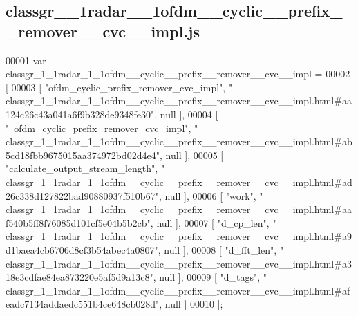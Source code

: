 \subsection{classgr\+\_\+\_\+1radar\+\_\+\_\+1ofdm\+\_\+\+\_\+cyclic\+\_\+\+\_\+prefix\+\_\+\+\_\+remover\+\_\+\+\_\+cvc\+\_\+\+\_\+impl.\+js}
\label{classgr__1__1radar__1__1ofdm____cyclic____prefix____remover____cvc____impl_8js_source}

\begin{DoxyCode}
00001 var classgr_1_1radar_1_1ofdm__cyclic__prefix__remover__cvc__impl =
00002 [
00003     [ \textcolor{stringliteral}{"ofdm\_cyclic\_prefix\_remover\_cvc\_impl"}, \textcolor{stringliteral}{"
      classgr\_1\_1radar\_1\_1ofdm\_\_cyclic\_\_prefix\_\_remover\_\_cvc\_\_impl.html#aa124c26c43a041a6f9b328de9348fe30"}, null ],
00004     [ \textcolor{stringliteral}{"~ofdm\_cyclic\_prefix\_remover\_cvc\_impl"}, \textcolor{stringliteral}{"
      classgr\_1\_1radar\_1\_1ofdm\_\_cyclic\_\_prefix\_\_remover\_\_cvc\_\_impl.html#ab5cd18fbb9675015aa374972bd02d4e4"}, null ],
00005     [ \textcolor{stringliteral}{"calculate\_output\_stream\_length"}, \textcolor{stringliteral}{"
      classgr\_1\_1radar\_1\_1ofdm\_\_cyclic\_\_prefix\_\_remover\_\_cvc\_\_impl.html#ad26c338d127822bad90880937f510b67"}, null ],
00006     [ \textcolor{stringliteral}{"work"}, \textcolor{stringliteral}{"
      classgr\_1\_1radar\_1\_1ofdm\_\_cyclic\_\_prefix\_\_remover\_\_cvc\_\_impl.html#aaf540b5ff8f76085d101cf5e04b5b2cb"}, null ],
00007     [ \textcolor{stringliteral}{"d\_cp\_len"}, \textcolor{stringliteral}{"
      classgr\_1\_1radar\_1\_1ofdm\_\_cyclic\_\_prefix\_\_remover\_\_cvc\_\_impl.html#a9d1baea4cb6706d8cf3b54abec4a0807"}, null ],
00008     [ \textcolor{stringliteral}{"d\_fft\_len"}, \textcolor{stringliteral}{"
      classgr\_1\_1radar\_1\_1ofdm\_\_cyclic\_\_prefix\_\_remover\_\_cvc\_\_impl.html#a318e3cdfae84ea873220e5af5d9a13c8"}, null ],
00009     [ \textcolor{stringliteral}{"d\_tags"}, \textcolor{stringliteral}{"
      classgr\_1\_1radar\_1\_1ofdm\_\_cyclic\_\_prefix\_\_remover\_\_cvc\_\_impl.html#afeadc7134addaedc551b4ce648cb028d"}, null ]
00010 ];
\end{DoxyCode}
